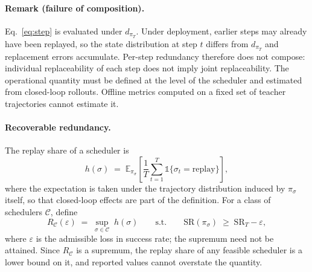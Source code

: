 \documentclass{article}
\begin{document}
\paragraph{Remark (failure of composition).}
Eq.~\ref{eq:step} is evaluated under $d_{\pi_T}$. Under deployment, earlier
steps may already have been replayed, so the state distribution at step $t$
differs from $d_{\pi_T}$ and replacement errors accumulate. Per-step redundancy
therefore does not compose: individual replaceability of each step does not
imply joint replaceability. The operational quantity must be defined at the
level of the scheduler and estimated from closed-loop rollouts. Offline metrics
computed on a fixed set of teacher trajectories cannot estimate it.

\paragraph{Recoverable redundancy.}
The replay share of a scheduler is
\begin{equation}
h(\sigma) \;=\; \mathbb{E}_{\pi_\sigma}\!\left[\frac{1}{T}\sum_{t=1}^{T}
\mathbb{1}\{\sigma_t = \mathrm{replay}\}\right],
\label{eq:h}
\end{equation}
where the expectation is taken under the trajectory distribution induced by
$\pi_\sigma$ itself, so that closed-loop effects are part of the definition.
For a class of schedulers $\mathcal{C}$, define
\begin{equation}
R_{\mathcal{C}}(\varepsilon) \;=\; \sup_{\sigma \in \mathcal{C}} \; h(\sigma)
\qquad \text{s.t.} \qquad
\mathrm{SR}(\pi_\sigma) \;\ge\; \mathrm{SR}_T - \varepsilon ,
\label{eq:R}
\end{equation}
where $\varepsilon$ is the admissible loss in success rate; the supremum need
not be attained. Since $R_{\mathcal{C}}$ is a supremum, the replay share of any
feasible scheduler is a lower bound on it, and reported values cannot overstate
the quantity.
\end{document}
